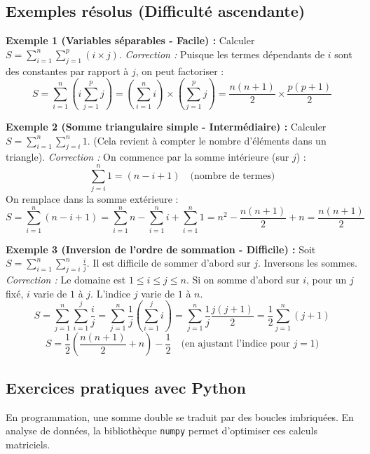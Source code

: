 \documentclass[12pt,a4paper]{report}
\begin{document}
\subsection{Exemples résolus (Difficulté ascendante)}

\textbf{Exemple 1 (Variables séparables - Facile) :} 
Calculer $S = \sum_{i=1}^{n} \sum_{j=1}^{p} (i \times j)$.
\textit{Correction :} Puisque les termes dépendants de $i$ sont des constantes par rapport à $j$, on peut factoriser :
\[ S = \sum_{i=1}^{n} \left( i \sum_{j=1}^{p} j \right) = \left( \sum_{i=1}^{n} i \right) \times \left( \sum_{j=1}^{p} j \right) = \frac{n(n+1)}{2} \times \frac{p(p+1)}{2} \]

\textbf{Exemple 2 (Somme triangulaire simple - Intermédiaire) :}
Calculer $S = \sum_{i=1}^{n} \sum_{j=i}^{n} 1$. (Cela revient à compter le nombre d'éléments dans un triangle).
\textit{Correction :} On commence par la somme intérieure (sur $j$) :
\[ \sum_{j=i}^{n} 1 = (n - i + 1) \quad \text{(nombre de termes)} \]
On remplace dans la somme extérieure :
\[ S = \sum_{i=1}^{n} (n - i + 1) = \sum_{i=1}^{n} n - \sum_{i=1}^{n} i + \sum_{i=1}^{n} 1 = n^2 - \frac{n(n+1)}{2} + n = \frac{n(n+1)}{2} \]

\textbf{Exemple 3 (Inversion de l'ordre de sommation - Difficile) :}
Soit $S = \sum_{i=1}^{n} \sum_{j=i}^{n} \frac{i}{j}$. Il est difficile de sommer d'abord sur $j$. Inversons les sommes.
\textit{Correction :} Le domaine est $1 \le i \le j \le n$. 
Si on somme d'abord sur $i$, pour un $j$ fixé, $i$ varie de $1$ à $j$. L'indice $j$ varie de $1$ à $n$.
\[ S = \sum_{j=1}^{n} \sum_{i=1}^{j} \frac{i}{j} = \sum_{j=1}^{n} \frac{1}{j} \left( \sum_{i=1}^{j} i \right) = \sum_{j=1}^{n} \frac{1}{j} \frac{j(j+1)}{2} = \frac{1}{2} \sum_{j=1}^{n} (j+1) \]
\[ S = \frac{1}{2} \left( \frac{n(n+1)}{2} + n \right) - \frac{1}{2} \quad \text{(en ajustant l'indice pour } j=1) \]

\subsection{Exercices pratiques avec Python}
En programmation, une somme double se traduit par des boucles imbriquées. En analyse de données, la bibliothèque \texttt{numpy} permet d'optimiser ces calculs matriciels.
\end{document}
